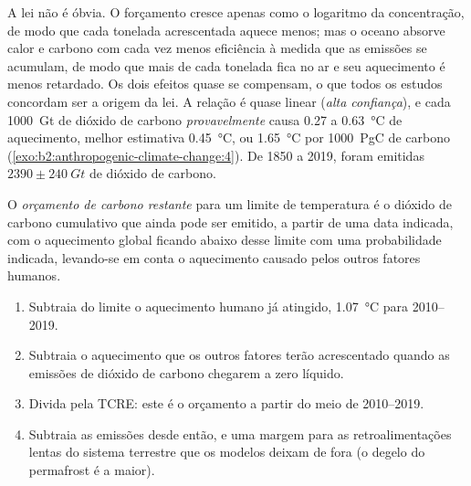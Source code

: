 A lei não é óbvia. O forçamento cresce apenas como o logaritmo da concentração, de modo que cada
tonelada acrescentada aquece menos; mas o oceano absorve calor e carbono com cada vez menos eficiência à medida que
as emissões se acumulam, de modo que mais de cada tonelada fica no ar e seu aquecimento é menos retardado. Os
dois efeitos quase se compensam, o que todos os estudos concordam ser a origem da lei. A relação é
quase linear (\emph{alta confiança}), e cada \qty{1000}{Gt} de dióxido de carbono \emph{provavelmente} causa
0.27 a \qty{0.63}{\celsius} de aquecimento, melhor estimativa \qty{0.45}{\celsius}, ou \qty{1.65}{\celsius}
por \qty{1000}{PgC} de carbono (\cref{exo:b2:anthropogenic-climate-change:4}). De 1850 a 2019,
foram emitidas $\num{2390} \pm \qty{240}{Gt}$ de dióxido de carbono.

\begin{definition}\label{def:b2:anthropogenic-climate-change:budget}
O \emph{orçamento de carbono restante} para um limite de temperatura é o
dióxido de carbono cumulativo que ainda pode ser emitido, a partir de uma data indicada, com o aquecimento global ficando
abaixo desse limite com uma probabilidade indicada, levando-se em conta o aquecimento causado pelos outros fatores
humanos.
\end{definition}

\begin{method}\label{met:b2:anthropogenic-climate-change:budget}
\begin{enumerate}
  \item Subtraia do limite o aquecimento humano já atingido,
        \qty{1.07}{\celsius} para 2010--2019.
  \item Subtraia o aquecimento que os outros fatores terão acrescentado quando as emissões de dióxido de carbono
        chegarem a zero líquido.
  \item Divida pela TCRE: este é o orçamento a partir do meio de 2010--2019.
  \item Subtraia as emissões desde então, e uma margem para as retroalimentações lentas do sistema terrestre que os
        modelos deixam de fora (o degelo do permafrost é a maior).
\end{enumerate}
\end{method}

